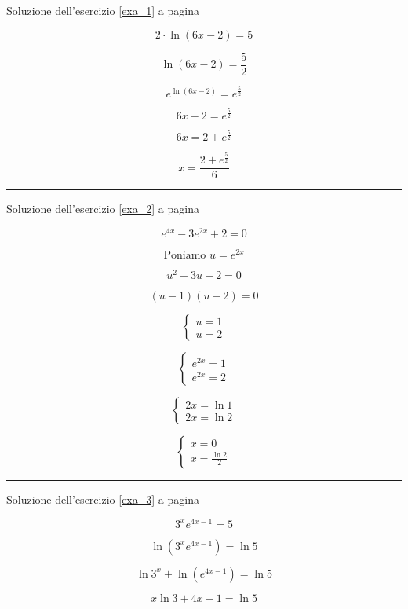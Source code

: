 Soluzione dell'esercizio \ref{exa_1} a pagina \pageref{exa_1}\label{sola_1}

\[
2\cdot \ln(6x - 2) = 5
\]

\[
\ln(6x - 2) = \frac{5}{2}
\]

\[
e^{\ln(6x - 2)} = e^{\frac{5}{2}}
\]


\[
6x - 2 = e^{\frac{5}{2}}
\]

\[
6x = 2+e^{\frac{5}{2}}
\]


\[
x = \frac{2+e^{\frac{5}{2}}}{6}
\]


\vspace{1cm}
\hrule
\vspace{1cm}

Soluzione dell'esercizio \ref{exa_2} a pagina \pageref{exa_2}\label{sola_2}

\[
e^{4x} - 3e^{2x} + 2 = 0
\]


\[
\textrm{Poniamo }u=e^{2x}
\]


\[
u^2-3u+2=0
\]


\[
(u - 1)(u - 2) =0
\]

\[
\left\{
\begin{array}{ll}
u=1 \\
u=2
\end{array}
\right.
\]

\[
\left\{
\begin{array}{ll}
e^{2x}=1 \\
e^{2x}=2
\end{array}
\right.
\]

\[
\left\{
\begin{array}{ll}
2x=\ln1 \\
2x=\ln2
\end{array}
\right.
\]

\[
\left\{
\begin{array}{ll}
x=0 \\
x=\frac{\ln2}{2}
\end{array}
\right.
\]



\vspace{1cm}
\hrule
\vspace{1cm}

Soluzione dell'esercizio \ref{exa_3} a pagina \pageref{exa_3}\label{sola_3}


\[
3^xe^{4x-1} = 5
\]

\[
\ln ( 3^xe^{4x - 1} ) = \ln 5
\]

\[
\ln 3^x + \ln ( e^{4x - 1} ) = \ln 5
\]

\[
x\ln 3+4x-1=\ln 5
\]

